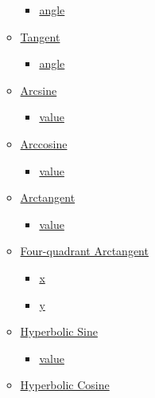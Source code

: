 \begin{itemize}
\begin{itemize}
    \begin{itemize}
    \tightlist
    \item
      \hyperref[functions-cos-angle]{angle}
    \end{itemize}
  \item
    \hyperref[functions-tan]{Tangent}

    \begin{itemize}
    \tightlist
    \item
      \hyperref[functions-tan-angle]{angle}
    \end{itemize}
  \item
    \hyperref[functions-asin]{Arcsine}

    \begin{itemize}
    \tightlist
    \item
      \hyperref[functions-asin-value]{value}
    \end{itemize}
  \item
    \hyperref[functions-acos]{Arccosine}

    \begin{itemize}
    \tightlist
    \item
      \hyperref[functions-acos-value]{value}
    \end{itemize}
  \item
    \hyperref[functions-atan]{Arctangent}

    \begin{itemize}
    \tightlist
    \item
      \hyperref[functions-atan-value]{value}
    \end{itemize}
  \item
    \hyperref[functions-atan2]{Four-quadrant Arctangent}

    \begin{itemize}
    \tightlist
    \item
      \hyperref[functions-atan2-x]{x}
    \item
      \hyperref[functions-atan2-y]{y}
    \end{itemize}
  \item
    \hyperref[functions-sinh]{Hyperbolic Sine}

    \begin{itemize}
    \tightlist
    \item
      \hyperref[functions-sinh-value]{value}
    \end{itemize}
  \item
    \hyperref[functions-cosh]{Hyperbolic Cosine}


\end{itemize}
\end{itemize}
